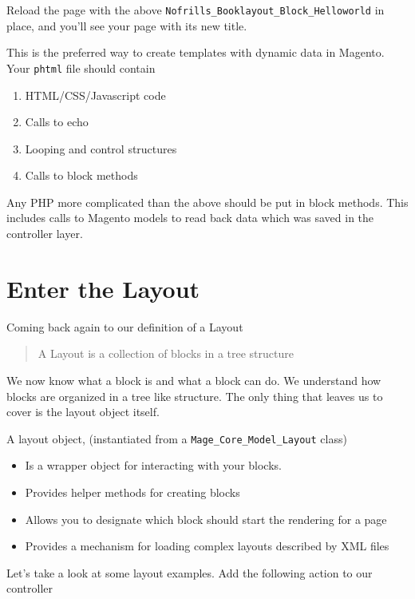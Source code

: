 \documentclass[oneside]{book}
\begin{document}
Reload the page with the above \footnotesize\texttt{Nofrills\_Booklayout\_Block\_Helloworld} \normalsize  in place, and you'll see your page with its new title.

This is the preferred way to create templates with dynamic data in Magento.  Your \footnotesize\texttt{phtml} \normalsize  file should contain

\begin{enumerate}
\item HTML/CSS/Javascript code
\item Calls to echo
\item Looping and control structures
\item Calls to block methods
\end{enumerate}


Any PHP more complicated than the above should be put in block methods. This includes calls to Magento models to read back data which was saved in the controller layer.

\section{Enter the Layout}

Coming back again to our definition of a Layout

\begin{quote}
A Layout is a collection of blocks in a tree structure
\end{quote}

We now know what a block is and what a block can do.  We understand how blocks are organized in a tree like structure.  The only thing that leaves us to cover is the layout object itself.

A layout object, (instantiated from a \footnotesize\texttt{Mage\_Core\_Model\_Layout} \normalsize  class)

\begin{itemize}
\item Is a wrapper object for interacting with your blocks.
\item Provides helper methods for creating blocks
\item Allows you to designate which block should start the rendering for a page
\item Provides a mechanism for loading complex layouts described by XML files
\end{itemize}


Let's take a look at some layout examples.  Add the following action to our controller
\end{document}
